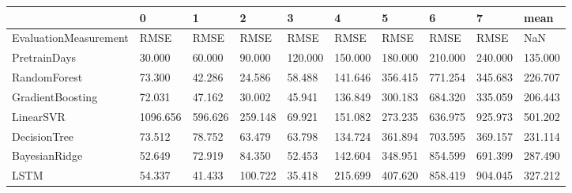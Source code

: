 \begin{tabular}{llllllllll}
\toprule
{} &        0 &       1 &       2 &       3 &       4 &       5 &       6 &       7 &    mean \\
\midrule
EvaluationMeasurement &     RMSE &    RMSE &    RMSE &    RMSE &    RMSE &    RMSE &    RMSE &    RMSE &     NaN \\
PretrainDays          &   30.000 &  60.000 &  90.000 & 120.000 & 150.000 & 180.000 & 210.000 & 240.000 & 135.000 \\
RandomForest          &   73.300 &  42.286 &  24.586 &  58.488 & 141.646 & 356.415 & 771.254 & 345.683 & 226.707 \\
GradientBoosting      &   72.031 &  47.162 &  30.002 &  45.941 & 136.849 & 300.183 & 684.320 & 335.059 & 206.443 \\
LinearSVR             & 1096.656 & 596.626 & 259.148 &  69.921 & 151.082 & 273.235 & 636.975 & 925.973 & 501.202 \\
DecisionTree          &   73.512 &  78.752 &  63.479 &  63.798 & 134.724 & 361.894 & 703.595 & 369.157 & 231.114 \\
BayesianRidge         &   52.649 &  72.919 &  84.350 &  52.453 & 142.604 & 348.951 & 854.599 & 691.399 & 287.490 \\
LSTM                  &   54.337 &  41.433 & 100.722 &  35.418 & 215.699 & 407.620 & 858.419 & 904.045 & 327.212 \\
\bottomrule
\end{tabular}
